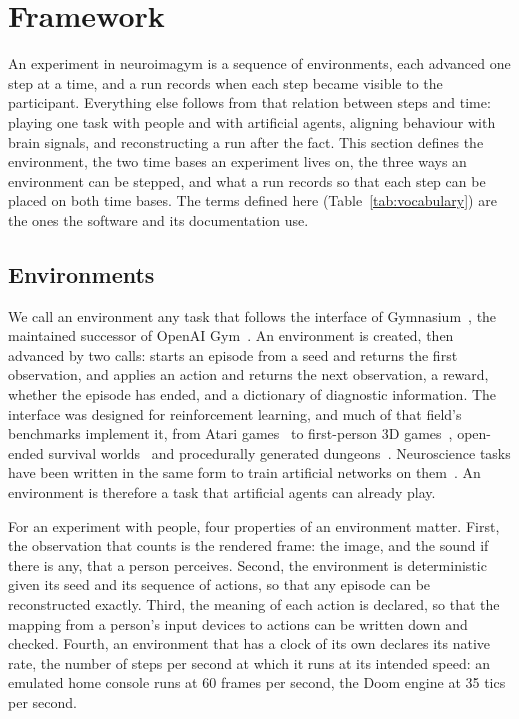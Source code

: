 \section{Framework}
\label{sec:framework}

An experiment in neuroimagym is a sequence of environments, each advanced one step at a time, and a run records when each step became visible to the participant.
Everything else follows from that relation between steps and time: playing one task with people and with artificial agents, aligning behaviour with brain signals, and reconstructing a run after the fact.
This section defines the environment, the two time bases an experiment lives on, the three ways an environment can be stepped, and what a run records so that each step can be placed on both time bases.
The terms defined here (Table~\ref{tab:vocabulary}) are the ones the software and its documentation use.

\subsection{Environments}
\label{sec:environments}

We call an environment any task that follows the interface of Gymnasium~\citep{towers2024gymnasium}, the maintained successor of OpenAI Gym~\citep{brockman2016gym}.
An environment is created, then advanced by two calls:  starts an episode from a seed and returns the first observation, and  applies an action and returns the next observation, a reward, whether the episode has ended, and a dictionary of diagnostic information.
The interface was designed for reinforcement learning, and much of that field's benchmarks implement it, from Atari games~\citep{bellemare2013ale} to first-person 3D games~\citep{kempka2016vizdoom}, open-ended survival worlds~\citep{hafner2022crafter} and procedurally generated dungeons~\citep{kuttler2020nethack,samvelyan2021minihack}.
Neuroscience tasks have been written in the same form to train artificial networks on them~\citep{molanomazon2022neurogym}.
An environment is therefore a task that artificial agents can already play.

For an experiment with people, four properties of an environment matter.
First, the observation that counts is the rendered frame: the image, and the sound if there is any, that a person perceives.
Second, the environment is deterministic given its seed and its sequence of actions, so that any episode can be reconstructed exactly.
Third, the meaning of each action is declared, so that the mapping from a person's input devices to actions can be written down and checked.
Fourth, an environment that has a clock of its own declares its native rate, the number of steps per second at which it runs at its intended speed: an emulated home console runs at 60 frames per second, the Doom engine at 35 tics per second.

